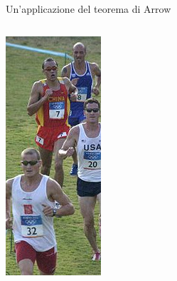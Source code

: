 \documentclass[aspectratio=64,12pt]{beamer}
\begin{document}
\begin{frame}{Un'applicazione del teorema di Arrow}
\begin{resize}{.9}
\begin{columns}
\begin{column}{.2\columnwidth}
\begin{center}
\includegraphics[width=\textwidth]{./figure/Pentathlon.jpg}
\end{center}
\end{column}
\end{columns}
\end{resize}
\end{frame}
\end{document}
